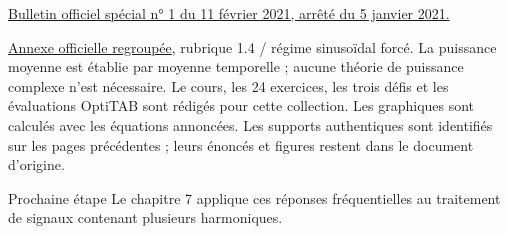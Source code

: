 \href{https://www.education.gouv.fr/bo/21/Special1/ESRS2035779A.htm}{Bulletin officiel spécial n° 1 du 11 février 2021, arrêté du 5 janvier 2021.}\par
\href{https://cache.media.education.gouv.fr/file/SPE1-MEN-MESRI-4-2-2021/64/8/spe779_annexe_1373648.pdf}{Annexe officielle regroupée}, rubrique 1.4 / régime sinusoïdal forcé. La puissance moyenne est établie par moyenne temporelle ; aucune théorie de puissance complexe n’est nécessaire.
Le cours, les 24 exercices, les trois défis et les évaluations OptiTAB sont rédigés pour cette collection. Les graphiques sont calculés avec les équations annoncées. Les supports authentiques sont identifiés sur les pages précédentes ; leurs énoncés et figures restent dans le document d’origine.
\begin{methode}{Prochaine étape}
Le chapitre 7 applique ces réponses fréquentielles au traitement de signaux contenant plusieurs harmoniques.
\end{methode}

